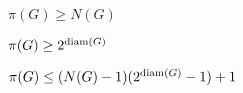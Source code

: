 \documentclass[12pt]{article}
\begin{document}
$\pi(G)\ge N(G)$
\vspace{0.3 in}

$\pi(G)\ge 2^{{\rm diam}(G)}$
\vspace{0.3 in}

$\pi(G)\le (N(G)-1)(2^{{\rm diam}(G)}-1)+1$
\vspace{0.3 in}
\end{document}
